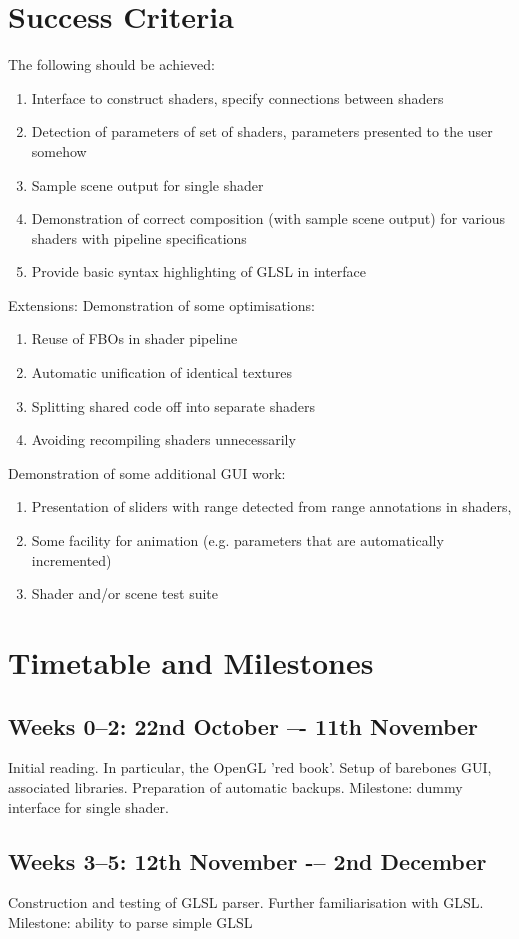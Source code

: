 \section*{Success Criteria}
The following should be achieved:
\begin{enumerate}
\item Interface to construct shaders, specify connections between shaders
\item Detection of parameters of set of shaders, parameters presented to the user somehow
\item Sample scene output for single shader
\item Demonstration of correct composition (with sample scene output) for various shaders with
pipeline specifications
\item Provide basic syntax highlighting of GLSL in interface
\end{enumerate}
Extensions:
Demonstration of some optimisations:
\begin{enumerate}
\item Reuse of FBOs in shader pipeline
\item Automatic unification of identical textures
\item Splitting shared code off into separate shaders
\item Avoiding recompiling shaders unnecessarily
\end{enumerate}
Demonstration of some additional GUI work:
\begin{enumerate}
\item Presentation of sliders with range detected from range annotations in shaders,
\item Some facility for animation (e.g. parameters that are automatically incremented)
\item Shader and/or scene test suite
\end{enumerate}

\section{Timetable and Milestones}
\subsection{Weeks 0--2: 22nd October –- 11th November}
Initial reading. In particular, the OpenGL 'red book'. Setup of barebones GUI, associated libraries.
Preparation of automatic backups.
Milestone: dummy interface for single shader.
\subsection{Weeks 3--5: 12th November -– 2nd December}
Construction and testing of GLSL parser. Further familiarisation with GLSL.
Milestone: ability to parse simple GLSL
